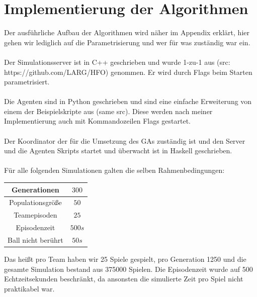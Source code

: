 



    \section{Implementierung der Algorithmen}
        Der ausführliche Aufbau der Algorithmen wird näher im Appendix erklärt, hier gehen wir lediglich auf die Parametrisierung und wer für was zuständig war ein. \\
        \\
        Der Simulationsserver ist in C++ geschrieben und wurde 1-zu-1 aus (src: https://github.com/LARG/HFO) genommen. Er wird durch Flags beim Starten parametrisiert. \\
        \\
        Die Agenten sind in Python geschrieben und sind eine einfache Erweiterung von einem der Beispielskripte aus (same src). Diese werden nach meiner Implementierung auch mit Kommandozeilen Flags gestartet.\\
        \\
        Der Koordinator der für die Umsetzung des GAs zuständig ist und den Server und die Agenten Skripts startet und überwacht ist in Haskell geschrieben.\\
        \\
        Für alle folgenden Simulationen galten die selben Rahmenbedingungen:

            \begin{center}
            \begin{tabular}{ |c|c| } 
                \hline
                Generationen       & $300$  \\ \hline
                Populationsgröße   & $50$   \\ \hline
                Teamepisoden       & $25$   \\ \hline
                Episodenzeit       & $500s$ \\ \hline
                Ball nicht berührt & $50s$  \\ \hline
            \end{tabular}
            \end{center}

        Das heißt pro Team haben wir 25 Spiele gespielt, pro Generation 1250 und die gesamte Simulation bestand aus 375000 Spielen.
        Die Episodenzeit wurde auf 500 Echtzeitsekunden beschränkt, da ansonsten die simulierte Zeit pro Spiel nicht praktikabel war.

